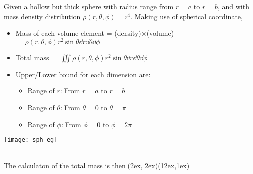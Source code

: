 \documentclass[class=article, crop=false, 12pt]{standalone}
\begin{document}
\begin{example}
    Given a hollow but thick sphere with radius range from $r=a$ to $r=b$,
    and with mass density distribution $\rho(r,\theta,\phi)=r^4$.
    Making use of spherical coordinate,
    \begin{itemize}
        \item Mass of each volume element = (density)$\times$(volume) $= \rho(r,\theta,\phi)r^2\sin\theta\dd{r}\dd{\theta}\dd{\phi}$
        \item Total mass $= \iiint \rho(r,\theta,\phi) r^2\sin\theta\dd{r}\dd{\theta}\dd{\phi}$
    \end{itemize}

    \begin{minipage}{0.7\textwidth}
         \begin{itemize}
            \item Upper/Lower bound for each dimension are:
            \begin{itemize}
                \item Range of $r$: From $r=a$ to $r=b$
                \item Range of $\theta$: From $\theta=0$ to $\theta = \pi$
                \item Range of $\phi$: From $\phi=0$ to $\phi=2\pi$
            \end{itemize}
        \end{itemize}
    \end{minipage}
    \begin{minipage}{0.2\textwidth}
        \texttt{[image: sph\_eg]}
    \end{minipage}

    \hfill\\[1em]
    The calculaton of the total mass is then
    {(2ex, 2ex)}{(12ex,1ex)}

\end{example}
\theend
\end{document}
